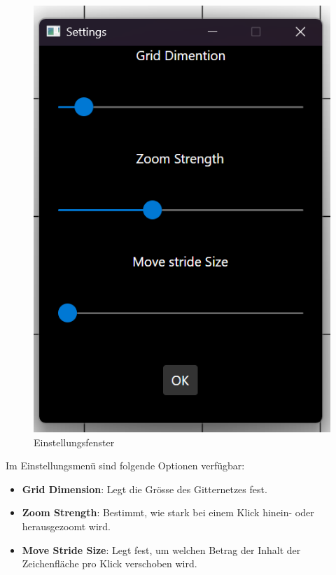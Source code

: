 \begin{figure}[H]
    \centering
    \includegraphics[width=0.5\linewidth]{graphics/settings_window.png}
    \caption{Einstellungsfenster}
    \label{fig:settings_window}
\end{figure}

Im Einstellungsmenü sind folgende Optionen verfügbar:
\begin{itemize}
    \item \textbf{Grid Dimension}: Legt die Grösse des Gitternetzes fest.
    \item \textbf{Zoom Strength}: Bestimmt, wie stark bei einem Klick hinein- oder herausgezoomt wird.
    \item \textbf{Move Stride Size}: Legt fest, um welchen Betrag der Inhalt der Zeichenfläche pro Klick verschoben wird.
\end{itemize}
